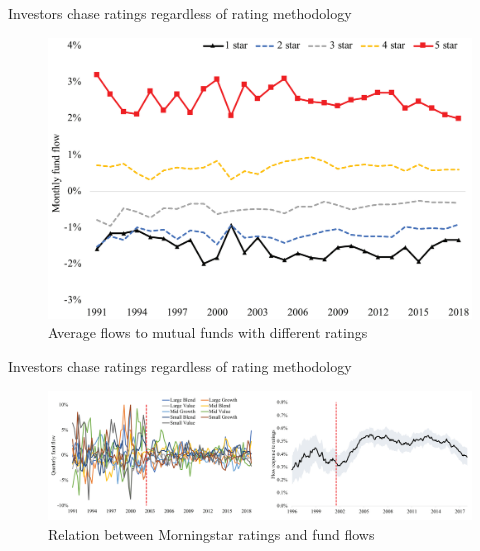 \documentclass[UTF8, 16pt]{beamer}
\begin{document}
\begin{CJK*}{UTF8}{gbsn}
\begin{frame}{Investors chase ratings regardless of rating methodology}
	\begin{figure}[htpb]
	  \begin{center}
	    \includegraphics[width=0.85 \linewidth]
	    {pic/fund_flow_by_rating.png}
	  \end{center}
	  \caption{Average flows to mutual funds with different ratings}
	\end{figure}
\end{frame}

\begin{frame}{Investors chase ratings regardless of rating methodology}
	\begin{figure}[htpb]
	  \begin{center}
	    \includegraphics[width=1.06  \linewidth]
	    {pic/fund_flow_change.png}
	  \end{center}
	  \caption{Relation between Morningstar ratings and fund flows}
	\end{figure}
\end{frame}


\end{CJK*}
\end{document}
